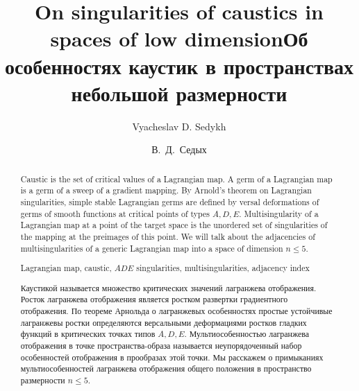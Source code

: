 \begin{englishtitle}
\title{On singularities of caustics in spaces of low dimension}
\author{Vyacheslav D. Sedykh}
\maketitle

\begin{abstract}
Caustic is the set of critical values of a Lagrangian map. A germ of a Lagrangian map is a germ of a sweep of a gradient mapping. By Arnold's theorem on Lagrangian singularities, simple stable Lagrangian germs are defined by versal deformations of germs of smooth functions at critical points of types $A,D,E$. Multisingularity of a Lagrangian map at a point of the target space is the unordered set of singularities of the mapping at the preimages of this point. We will talk about the adjacencies of multisingularities of a generic Lagrangian map into a space of dimension $n\leq5$. 

\keywords
{Lagrangian map, caustic, $ADE$ singularities, multisingularities, adjacency index}
\end{abstract}
\end{englishtitle}

\iffalse
\documentclass[12pt]{llncs}
\usepackage[T2A]{fontenc}
\usepackage[utf8]{inputenc}
\usepackage[english,russian]{babel}
\usepackage[russian]{nla}




\fi

\title{Об особенностях каустик в пространствах небольшой размерности}
\author{В.~Д.~Седых 
} %

\maketitle

\begin{abstract}
Каустикой называется множество критических значений лагранжева отображения. Росток лагранжева отображения является ростком развертки градиентного отображения. По теореме Арнольда о лагранжевых особенностях простые устойчивые лагранжевы ростки определяются версальными деформациями ростков гладких функций в критических точках типов $A,D,E$. Мультиособенностью лагранжева отображения в точке пространства-образа называется неупорядоченный набор особенностей отображения в прообразах этой точки. Мы расскажем о примыканиях мультиособенностей лагранжева отображения общего положения в пространство размерности $n\leq5$. 

\end{abstract}






%


